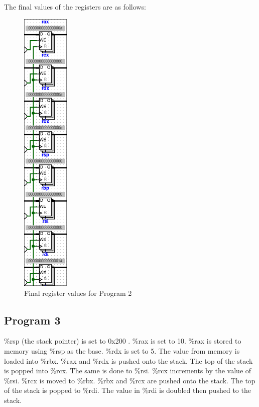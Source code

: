 \documentclass{article}
\begin{document}
The final values of the registers are as follows:

\begin{figure}
    \centering
    \includegraphics[width=0.2\textwidth]{./images/test3_reg.png}
    \caption{Final register values for Program 2}
\end{figure}

\subsection{Program 3}

\%rsp (the stack pointer) is set to 0x200 . 
\%rax is set to 10. 
\%rax is stored to memory using \%rsp as the base. 
\%rdx is set to 5. The value from memory is loaded into \%rbx. 
\%rax and \%rdx is pushed onto the stack. 
The top of the stack is popped into \%rcx. 
The same is done to \%rsi. 
\%rcx increments by the value of \%rsi. 
\%rcx is moved to \%rbx. 
\%rbx and \%rcx are pushed onto the stack. 
The top of the stack is popped to \%rdi. 
The value in \%rdi is doubled then pushed to the stack. 
\end{document}
